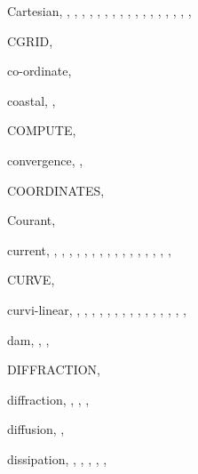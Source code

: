 \documentclass[12pt]{book}
\begin{document}
\begin{theindex}
  \item Cartesian, , , , 
		, , , 
		, , , 
		, , , 
		, , , 
		, , 
  \item CGRID, 
  \item co-ordinate, 
  \item coastal, , 
  \item COMPUTE, 
  \item convergence, , 
  \item COORDINATES, 
  \item Courant, 
  \item current, , , , 
		, , , 
		, , , 
		, , , 
		, , , 
		, 
  \item CURVE, 
  \item curvi-linear, , , , 
		, , , 
		, , , 
		, , , 
		, , , 

  \indexspace

  \item dam, , , 
  \item DIFFRACTION, 
  \item diffraction, , , , 
  \item diffusion, , 
  \item dissipation, , , , 
		, , 

  \indexspace


\end{theindex}
\end{document}
